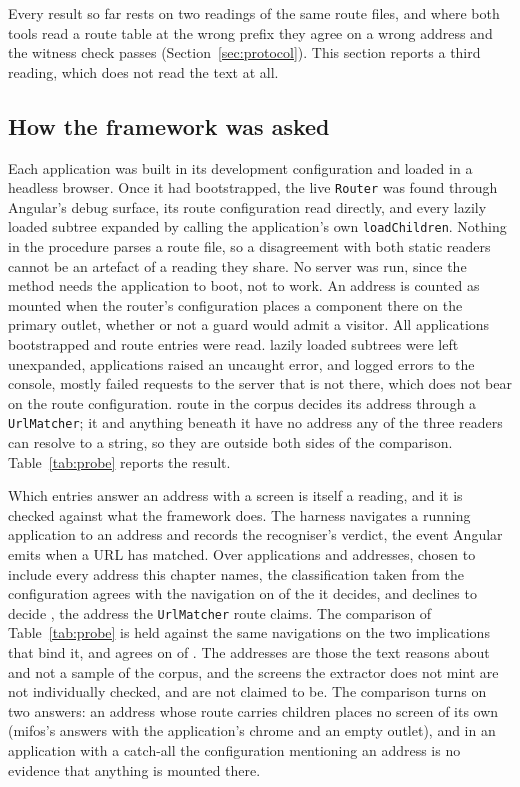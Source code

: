 Every result so far rests on two readings of the same route files, and where both tools read a route table at the wrong prefix they agree on a wrong address and the witness check passes (Section~\ref{sec:protocol}). This section reports a third reading, which does not read the text at all.

\subsection{How the framework was asked}

Each application was built in its development configuration and loaded in a headless browser. Once it had bootstrapped, the live \texttt{Router} was found through Angular's debug surface, its route configuration read directly, and every lazily loaded subtree expanded by calling the application's own \texttt{loadChildren}. Nothing in the procedure parses a route file, so a disagreement with both static readers cannot be an artefact of a reading they share. No server was run, since the method needs the application to boot, not to work. An address is counted as mounted when the router's configuration places a component there on the primary outlet, whether or not a guard would admit a visitor. All \ProbeApps{} applications bootstrapped and \ProbeRoutes{} route entries were read. \ProbeLazyFailures{} lazily loaded subtrees were left unexpanded, \ProbePageErrorApps{} applications raised an uncaught error, and \ProbeConsoleErrorApps{} logged errors to the console, mostly failed requests to the server that is not there, which does not bear on the route configuration. \ProbeMatcherRoutes{} route in the corpus decides its address through a \texttt{UrlMatcher}; it and anything beneath it have no address any of the three readers can resolve to a string, so they are outside both sides of the comparison. Table~\ref{tab:probe} reports the result.

Which entries answer an address with a screen is itself a reading, and it is checked against what the framework does. The harness navigates a running application to an address and records the recogniser's verdict, the event Angular emits when a URL has matched. Over \ProbeAnswerApps{} applications and \ProbeAnswerAddresses{} addresses, chosen to include every address this chapter names, the classification taken from the configuration agrees with the navigation on \ProbeAnswerAgreed{} of the \ProbeAnswerChecked{} it decides, and declines to decide \ProbeAnswerUndecided{}, the address the \texttt{UrlMatcher} route claims. The comparison of Table~\ref{tab:probe} is held against the same navigations on the two implications that bind it, and agrees on \ProbeCmpAgreed{} of \ProbeCmpChecked{}. The addresses are those the text reasons about and not a sample of the corpus, and the \ProbeMissed{} screens the extractor does not mint are not individually checked, and are not claimed to be. The comparison turns on two answers: an address whose route carries children places no screen of its own (mifos's  answers with the application's chrome and an empty outlet), and in an application with a catch-all the configuration mentioning an address is no evidence that anything is mounted there.


